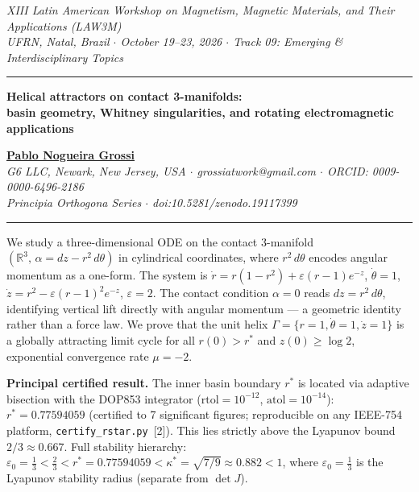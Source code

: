 \documentclass[11pt]{article}
\begin{document}
\begin{center}
{\small\textit{XIII Latin American Workshop on Magnetism, Magnetic Materials, and Their Applications (LAW3M)\\
UFRN, Natal, Brazil $\cdot$ October 19--23, 2026 $\cdot$ Track 09: Emerging \& Interdisciplinary Topics}}

\vspace{3pt}\rule{\linewidth}{0.8pt}\vspace{4pt}

{\fontsize{13}{16}\selectfont\textbf{Helical attractors on contact 3-manifolds:\\
basin geometry, Whitney singularities, and rotating electromagnetic applications}}

\vspace{4pt}
{\fontsize{11}{14}\selectfont\textbf{\underline{Pablo Nogueira Grossi}}}\\[1pt]
{\fontsize{10}{13}\selectfont\textit{G6 LLC, Newark, New Jersey, USA $\cdot$
grossiatwork@gmail.com $\cdot$ ORCID: 0009-0000-6496-2186}}\\
{\fontsize{10}{13}\selectfont\textit{Principia Orthogona Series $\cdot$ doi:10.5281/zenodo.19117399}}

\vspace{3pt}\rule{\linewidth}{0.4pt}
\end{center}

\vspace{3pt}

We study a three-dimensional ODE on the contact 3-manifold $(\mathbb{R}^3,\,\alpha=dz-r^2\,d\theta)$
in cylindrical coordinates, where $r^2\,d\theta$ encodes angular momentum as a one-form. The system is
$\dot r = r(1-r^2)+\varepsilon(r-1)e^{-z}$, $\dot\theta=1$, $\dot z = r^2-\varepsilon(r-1)^2e^{-z}$,
$\varepsilon=2$. The contact condition $\alpha=0$ reads $dz=r^2\,d\theta$, identifying vertical lift
directly with angular momentum --- a geometric identity rather than a force law. We prove that the
unit helix $\Gamma=\{r=1,\dot\theta=1,\dot z=1\}$ is a globally attracting limit cycle for all
$r(0)>r^*$ and $z(0)\geq\log 2$, exponential convergence rate $\mu=-2$.

\textbf{Principal certified result.}
The inner basin boundary $r^*$ is located via adaptive bisection with the DOP853 integrator
($\mathrm{rtol}=10^{-12}$, $\mathrm{atol}=10^{-14}$): $r^*=0.77594059$ (certified to
7 significant figures; reproducible on any IEEE-754 platform, \texttt{certify\_rstar.py}~[2]).
This lies strictly above the Lyapunov bound $2/3\approx0.667$.
Full stability hierarchy: $\varepsilon_0=\tfrac{1}{3}<\tfrac{2}{3}<r^*=0.77594059<\kappa^*=\sqrt{7/9}\approx0.882<1$,
where $\varepsilon_0=\tfrac{1}{3}$ is the Lyapunov stability radius (separate from $\det J$).
\end{document}
